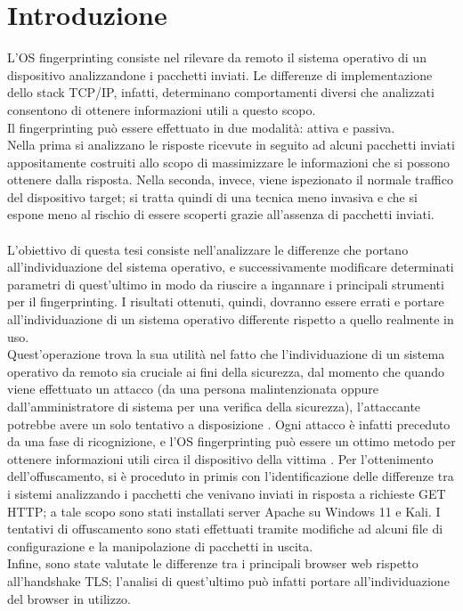 \chapter{Introduzione}
\label{introduzione}

L'OS fingerprinting consiste nel rilevare da remoto il sistema operativo di un dispositivo analizzandone i pacchetti inviati. Le differenze di implementazione dello stack TCP/IP, infatti, determinano comportamenti diversi che analizzati consentono di ottenere informazioni utili a questo scopo. \\
Il fingerprinting può essere effettuato in due modalità: attiva e passiva. \\ 
Nella prima si analizzano le risposte ricevute in seguito ad alcuni pacchetti inviati appositamente costruiti allo scopo di massimizzare le informazioni che si possono ottenere dalla risposta.
Nella seconda, invece, viene ispezionato il normale traffico del dispositivo target; si tratta quindi di una tecnica meno invasiva e che si espone meno al rischio di essere scoperti grazie all'assenza di pacchetti inviati.
\\
\\
L'obiettivo di questa tesi consiste nell'analizzare le differenze che portano all'individuazione del sistema operativo, e successivamente modificare determinati parametri di quest'ultimo in modo da riuscire a ingannare i principali strumenti per il fingerprinting.
I risultati ottenuti, quindi, dovranno essere errati e portare all'individuazione di un sistema operativo differente rispetto a quello realmente in uso.\\
Quest'operazione trova la sua utilità nel fatto che l'individuazione di un sistema operativo da remoto sia cruciale ai fini della sicurezza, dal momento che quando viene effettuato un attacco (da una persona malintenzionata oppure dall'amministratore di sistema per una verifica della sicurezza), l'attaccante potrebbe avere un solo tentativo a disposizione \cite{ragioni}. Ogni attacco è infatti preceduto da una fase di ricognizione, e l'OS fingerprinting può essere un ottimo metodo per ottenere informazioni utili circa il dispositivo della vittima \cite{prof}.
Per l'ottenimento dell'offuscamento, si è proceduto in primis con l'identificazione delle differenze tra i sistemi analizzando i pacchetti che venivano inviati in risposta a richieste GET HTTP; a tale scopo sono stati installati server Apache su Windows 11 e Kali. I tentativi di offuscamento sono stati effettuati tramite modifiche ad alcuni file di configurazione e la manipolazione di pacchetti in uscita.
\\
Infine, sono state valutate le differenze tra i principali browser web rispetto all'handshake TLS; l'analisi di quest'ultimo può infatti portare all'individuazione del browser in utilizzo.










